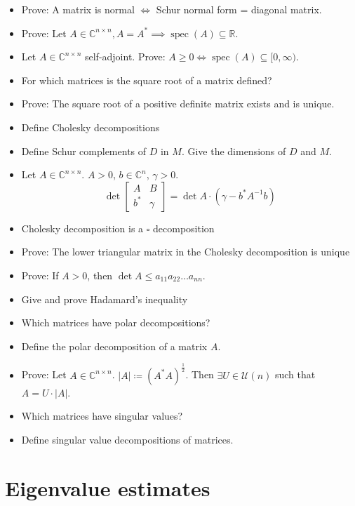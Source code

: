 \documentclass[a4paper]{article}
\newcommand{\card}[1]{\left|#1\right|}
\begin{document}
\begin{itemize}
  \item Prove: A matrix is normal $\iff$ Schur normal form = diagonal matrix.
  \item Prove: Let $A \in \mathbb C^{n \times n}, A = A^* \implies \operatorname{spec}(A) \subseteq \mathbb R$.
  \item Let $A \in \mathbb C^{n \times n}$ self-adjoint. Prove: $A \geq 0 \iff \operatorname{spec}(A) \subseteq [0, \infty)$.
  \item For which matrices is the square root of a matrix defined?
  \item Prove: The square root of a positive definite matrix exists and is unique.
  \item Define Cholesky decompositions
  \item Define Schur complements of $D$ in $M$. Give the dimensions of $D$ and $M$.
  \item Let $A \in \mathbb C^{n \times n}$. $A > 0$, $b \in \mathbb C^n$, $\gamma > 0$.
    \[ \det\left[\begin{array}{c|c}A & B \\ \hline b^* & \gamma \end{array}\right] = \det A \cdot (\gamma - b^* A^{-1} b)  \]
  \item Cholesky decomposition is a $\square{}$ decomposition
  \item Prove: The lower triangular matrix in the Cholesky decomposition is unique
  \item Prove: If $A > 0$, then $\det{A} \leq a_{11} a_{22} \dots a_{nn}$.
  \item Give and prove Hadamard's inequality
  \item Which matrices have polar decompositions?
  \item Define the polar decomposition of a matrix $A$.
  \item Prove: Let $A \in \mathbb C^{n \times n}$. $\card{A} \coloneqq (A^* A)^{\frac12}$. Then $\exists U \in \mathcal U(n)$ such that $A = U \cdot \card{A}$.
  \item Which matrices have singular values?
  \item Define singular value decompositions of matrices.
\end{itemize}

\section{Eigenvalue estimates}
\end{document}

